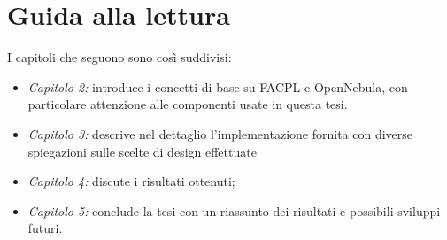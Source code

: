 \section{Guida alla lettura}
I capitoli che seguono sono così suddivisi:
\begin{itemize}
    \item \emph{Capitolo 2:} introduce i concetti di base su FACPL e OpenNebula, con particolare attenzione alle componenti usate in questa tesi.
    \item \emph{Capitolo 3:} descrive nel dettaglio l'implementazione fornita con diverse spiegazioni sulle scelte di design effettuate
    \item \emph{Capitolo 4:} discute i risultati ottenuti;
    \item \emph{Capitolo 5:} conclude la tesi con un riassunto dei risultati e possibili sviluppi futuri.
\end{itemize}